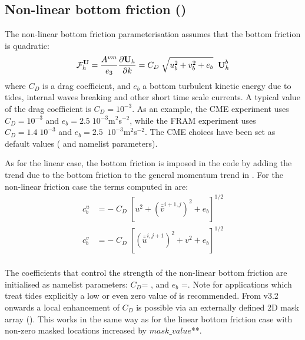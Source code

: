 \documentclass[../tex_main/NEMO_manual]{subfiles}
\begin{document}
\subsection{Non-linear bottom friction (\protect{})}
\label{subsec:ZDF_bfr_nonlinear}

The non-linear bottom friction parameterisation assumes that the bottom friction is quadratic: 
\begin{equation} \label{eq:zdfbfr_nonlinear}
{\cal F}_h^\textbf{U} = \frac{A^{vm}}{e_3 }\frac{\partial \textbf {U}_h 
}{\partial k}=C_D \;\sqrt {u_b ^2+v_b ^2+e_b } \;\; \textbf {U}_h^b 
\end{equation}
where $C_D$ is a drag coefficient, and $e_b $ a bottom turbulent kinetic energy due to tides,
internal waves breaking and other short time scale currents.
A typical value of the drag coefficient is $C_D = 10^{-3} $.
As an example, the CME experiment \citep{Treguier_JGR92} uses $C_D = 10^{-3}$ and
$e_b = 2.5\;10^{-3}$m$^2$\;s$^{-2}$, while the FRAM experiment \citep{Killworth1992} uses $C_D = 1.4\;10^{-3}$ and
$e_b =2.5\;\;10^{-3}$m$^2$\;s$^{-2}$.
The CME choices have been set as default values ( and  namelist parameters).

As for the linear case, the bottom friction is imposed in the code by adding the trend due to
the bottom friction to the general momentum trend in .
For the non-linear friction case the terms computed in  are:
\begin{equation} \label{eq:zdfbfr_nonlinbfr}
\begin{split}
 c_b^u &= - \; C_D\;\left[ u^2 + \left(\bar{\bar{v}}^{i+1,j}\right)^2 + e_b \right]^{1/2}\\
 c_b^v &= - \; C_D\;\left[  \left(\bar{\bar{u}}^{i,j+1}\right)^2 + v^2 + e_b \right]^{1/2}\\
\end{split}
\end{equation}

The coefficients that control the strength of the non-linear bottom friction are initialised as namelist parameters:
$C_D$= , and $e_b$ =.
Note for applications which treat tides explicitly a low or even zero value of  is recommended.
From v3.2 onwards a local enhancement of $C_D$ is possible via an externally defined 2D mask array
().
This works in the same way as for the linear bottom friction case with non-zero masked locations increased by
$mask\_value$**.
\end{document}
